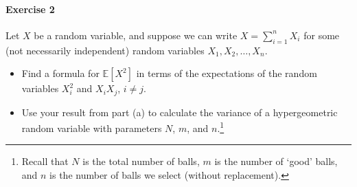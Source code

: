 \documentclass[a4paper,12pt]{article}
\newcommand{\mb}[1]{\mathbb{#1}}
\begin{document}
\paragraph{Exercise 2}  Let $X$ be a random variable, and suppose we can write $X = \sum_{i=1}^n X_i$ for some (not necessarily independent) random variables $X_1, X_2, \hdots, X_n$.
\begin{itemize}
	\item[(a)] Find a formula for $\mb{E}[X^2]$ in terms of the expectations of the random variables $X_i^2$ and $X_i X_j$, $i \neq j$.
	\item[(b)] Use your result from part (a) to calculate the variance of a hypergeometric random variable with parameters $N$, $m$, and $n$.\footnote{Recall that $N$ is the total number of balls, $m$ is the number of `good' balls, and $n$ is the number of balls we select (without replacement).}
\end{itemize}
\end{document}
